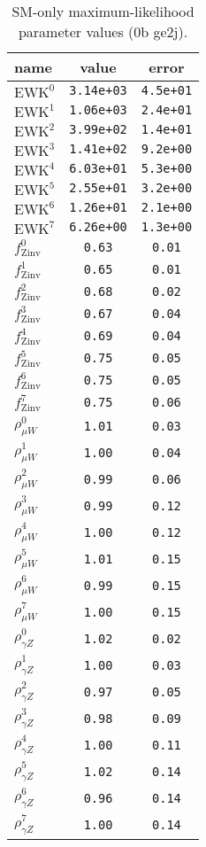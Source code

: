 \documentclass{article}
\begin{document}
\begin{table}\centering
\caption{SM-only maximum-likelihood parameter values (0b ge2j).}
\label{tab:mlParameterValues0b_ge2j}
\begin{tabular}{lcc}name & value & error \\ \hline
$\mathrm{EWK}^{0}$ & {\tt  3.14e+03} & {\tt  4.5e+01}\\
$\mathrm{EWK}^{1}$ & {\tt  1.06e+03} & {\tt  2.4e+01}\\
$\mathrm{EWK}^{2}$ & {\tt  3.99e+02} & {\tt  1.4e+01}\\
$\mathrm{EWK}^{3}$ & {\tt  1.41e+02} & {\tt  9.2e+00}\\
$\mathrm{EWK}^{4}$ & {\tt  6.03e+01} & {\tt  5.3e+00}\\
$\mathrm{EWK}^{5}$ & {\tt  2.55e+01} & {\tt  3.2e+00}\\
$\mathrm{EWK}^{6}$ & {\tt  1.26e+01} & {\tt  2.1e+00}\\
$\mathrm{EWK}^{7}$ & {\tt  6.26e+00} & {\tt  1.3e+00}\\
$f_\mathrm{Zinv}^{0}$ & {\tt 0.63} & {\tt 0.01}\\
$f_\mathrm{Zinv}^{1}$ & {\tt 0.65} & {\tt 0.01}\\
$f_\mathrm{Zinv}^{2}$ & {\tt 0.68} & {\tt 0.02}\\
$f_\mathrm{Zinv}^{3}$ & {\tt 0.67} & {\tt 0.04}\\
$f_\mathrm{Zinv}^{4}$ & {\tt 0.69} & {\tt 0.04}\\
$f_\mathrm{Zinv}^{5}$ & {\tt 0.75} & {\tt 0.05}\\
$f_\mathrm{Zinv}^{6}$ & {\tt 0.75} & {\tt 0.05}\\
$f_\mathrm{Zinv}^{7}$ & {\tt 0.75} & {\tt 0.06}\\
$\rho_{\mu W}^{0}$ & {\tt 1.01} & {\tt 0.03}\\
$\rho_{\mu W}^{1}$ & {\tt 1.00} & {\tt 0.04}\\
$\rho_{\mu W}^{2}$ & {\tt 0.99} & {\tt 0.06}\\
$\rho_{\mu W}^{3}$ & {\tt 0.99} & {\tt 0.12}\\
$\rho_{\mu W}^{4}$ & {\tt 1.00} & {\tt 0.12}\\
$\rho_{\mu W}^{5}$ & {\tt 1.01} & {\tt 0.15}\\
$\rho_{\mu W}^{6}$ & {\tt 0.99} & {\tt 0.15}\\
$\rho_{\mu W}^{7}$ & {\tt 1.00} & {\tt 0.15}\\
$\rho_{\gamma Z}^{0}$ & {\tt 1.02} & {\tt 0.02}\\
$\rho_{\gamma Z}^{1}$ & {\tt 1.00} & {\tt 0.03}\\
$\rho_{\gamma Z}^{2}$ & {\tt 0.97} & {\tt 0.05}\\
$\rho_{\gamma Z}^{3}$ & {\tt 0.98} & {\tt 0.09}\\
$\rho_{\gamma Z}^{4}$ & {\tt 1.00} & {\tt 0.11}\\
$\rho_{\gamma Z}^{5}$ & {\tt 1.02} & {\tt 0.14}\\
$\rho_{\gamma Z}^{6}$ & {\tt 0.96} & {\tt 0.14}\\
$\rho_{\gamma Z}^{7}$ & {\tt 1.00} & {\tt 0.14}\\
\hline
\end{tabular}
\end{table}
\end{document}
